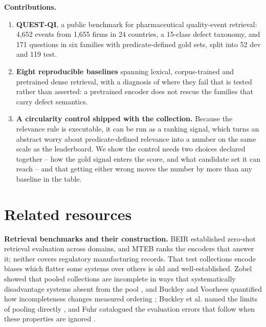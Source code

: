 \documentclass[runningheads]{llncs}
\begin{document}
\textbf{Contributions.}

\begin{enumerate}
\item \textbf{QUEST-QI}, a public benchmark for pharmaceutical quality-event retrieval: 4,652 events from 1,655 firms in 24 countries, a 15-class defect taxonomy, and 171 questions in six families with predicate-defined gold sets, split into 52 dev and 119 test.
\item \textbf{Eight reproducible baselines} spanning lexical, corpus-trained and pretrained dense retrieval, with a diagnosis of where they fail that is tested rather than asserted: a pretrained encoder does not rescue the families that carry defect semantics.
\item \textbf{A circularity control shipped with the collection.} Because the relevance rule is executable, it can be run as a ranking signal, which turns an abstract worry about predicate-defined relevance into a number on the same scale as the leaderboard. We show the control needs two choices declared together -- how the gold signal enters the score, and what candidate set it can reach -- and that getting either wrong moves the number by more than any baseline in the table.
\end{enumerate}


\section{Related resources}
\textbf{Retrieval benchmarks and their construction.} BEIR \cite{thakur2021beir} established zero-shot retrieval evaluation across domains, and MTEB \cite{muennighoff2022mteb} ranks the encoders that answer it; neither covers regulatory manufacturing records. That test collections encode biases which flatter some systems over others is old and well-established. Zobel showed that pooled collections are incomplete in ways that systematically disadvantage systems absent from the pool \cite{zobel1998reliable}, and Buckley and Voorhees quantified how incompleteness changes measured ordering \cite{buckley2004incomplete}; Buckley et al. named the limits of pooling directly \cite{buckley2007bias}, and Fuhr catalogued the evaluation errors that follow when these properties are ignored \cite{fuhr2017mistakes}.
\end{document}
